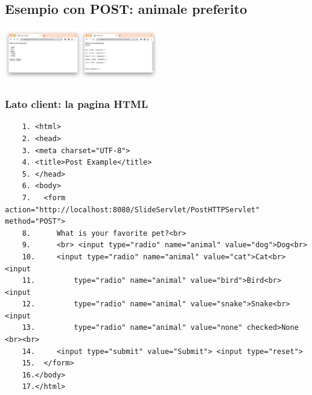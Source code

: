 \subsection{Esempio con POST: animale preferito}
\begin{center}
    \includegraphics[width=0.5\textwidth]{img/appWeb8.jpg}
\end{center}

\subsubsection{Lato client: la pagina HTML}
\begin{verbatim}
    1. <html>
    2. <head>
    3. <meta charset="UTF-8">
    4. <title>Post Example</title>
    5. </head>
    6. <body>
    7.   <form action="http://localhost:8080/SlideServlet/PostHTTPServlet" method="POST">
    8.      What is your favorite pet?<br>
    9.      <br> <input type="radio" name="animal" value="dog">Dog<br>
    10.     <input type="radio" name="animal" value="cat">Cat<br> <input
    11.         type="radio" name="animal" value="bird">Bird<br> <input
    12.         type="radio" name="animal" value="snake">Snake<br> <input
    13.         type="radio" name="animal" value="none" checked>None <br><br>
    14.     <input type="submit" value="Submit"> <input type="reset">
    15.  </form>
    16.</body>
    17.</html>
\end{verbatim}

